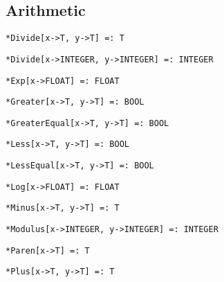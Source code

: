 \medskip
\subsection{Arithmetic}


\protect \large \begin{verbatim}
*Divide[x->T, y->T] =: T
\end{verbatim} \normalsize


\protect \large \begin{verbatim}
*Divide[x->INTEGER, y->INTEGER] =: INTEGER
\end{verbatim} \normalsize


\protect \large \begin{verbatim}
*Exp[x->FLOAT] =: FLOAT
\end{verbatim} \normalsize


\protect \large \begin{verbatim}
*Greater[x->T, y->T] =: BOOL
\end{verbatim}\normalsize


\protect \large \begin{verbatim}
*GreaterEqual[x->T, y->T] =: BOOL
\end{verbatim}\normalsize


\protect \large \begin{verbatim}
*Less[x->T, y->T] =: BOOL
\end{verbatim}\normalsize


\protect \large \begin{verbatim}
*LessEqual[x->T, y->T] =: BOOL
\end{verbatim}\normalsize


\protect \large \begin{verbatim}
*Log[x->FLOAT] =: FLOAT
\end{verbatim} \normalsize


\protect \large \begin{verbatim}
*Minus[x->T, y->T] =: T
\end{verbatim} \normalsize


\protect \large \begin{verbatim}
*Modulus[x->INTEGER, y->INTEGER] =: INTEGER
\end{verbatim}\normalsize

\protect \large \begin{verbatim}
*Paren[x->T] =: T
\end{verbatim}\normalsize

\protect \large \begin{verbatim}
*Plus[x->T, y->T] =: T
\end{verbatim} \normalsize

